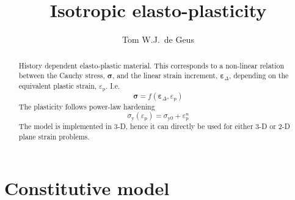\documentclass[times]{goose-article}
\title{Isotropic elasto-plasticity}
\author{Tom W.J.\ de Geus}
\begin{document}
\maketitle

\begin{abstract}
\noindent
History dependent elasto-plastic material. This corresponds to a non-linear relation between the Cauchy stress, $\bm{\sigma}$, and the linear strain increment, $\bm{\varepsilon}_\Delta$, depending on the equivalent plastic strain, $\varepsilon_\mathrm{p}$. I.e.
\begin{equation*}
  \bm{\sigma} =
  f ( \bm{\varepsilon}_\Delta , \varepsilon_\mathrm{p} )
\end{equation*}
The plasticity follows power-law hardening
\begin{equation*}
  \sigma_\mathrm{y} (\varepsilon_\mathrm{p})
  = \sigma_\mathrm{y0} + \varepsilon_\mathrm{p}^n
\end{equation*}
The model is implemented in 3-D, hence it can directly be used for either 3-D or 2-D plane strain problems.
\end{abstract}

\section{Constitutive model}
\end{document}
